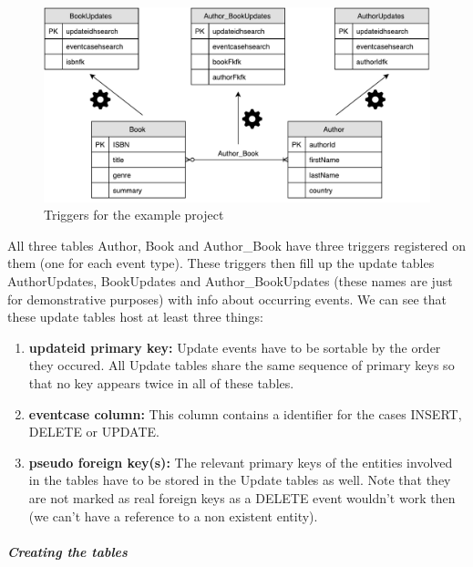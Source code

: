 \begin{figure}[ht]
	\centering
	\includegraphics[scale=0.6]{images/Triggers_Schema.pdf}
	\caption{Triggers for the example project}
	\label{triggers_schema}
\end{figure}
\noindent
All three tables Author, Book and Author\_Book have three triggers registered on them (one for each event type). These triggers then fill up the update tables AuthorUpdates, BookUpdates and Author\_BookUpdates (these names are just for demonstrative purposes) with info about occurring events. We can see that these update tables host at least three things:

\begin{enumerate}
	\item \textbf{updateid primary key:} Update events have to be sortable by the order they occured. All Update tables share the same sequence of primary keys so that no key appears twice in all of these tables.
	\item \textbf{eventcase column:} This column contains a identifier for the cases INSERT, DELETE or UPDATE.
	\item \textbf{pseudo foreign key(s):} The relevant primary keys of the entities involved in the tables have to be stored in the Update tables as well. Note that they are not marked as real foreign keys as a DELETE event wouldn't work then (we can't have a reference to a non existent entity).
\end{enumerate}

\pagebreak

\subparagraph{Creating the tables} \label{creating_the_tables}

